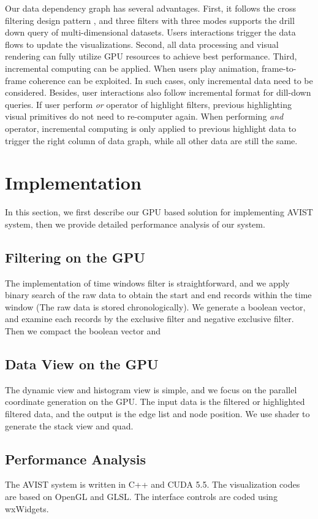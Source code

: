 \documentclass[journal]{vgtc}                %
\begin{document}
{ 
Our data dependency graph has several advantages. First, it follows the cross filtering design pattern \cite{weaver2010cross}, and three filters with three modes supports the drill down query of multi-dimensional datasets. Users interactions trigger the data flows to update the visualizations. Second, all data processing and visual rendering can fully utilize GPU resources to achieve best performance. Third,  incremental computing can be applied. When users play animation, frame-to-frame coherence can be exploited. In such cases, only incremental data need to be considered. Besides, user interactions also follow incremental format for dill-down queries. If user perform \emph{or} operator of highlight filters, previous highlighting visual primitives do not need to re-computer again. When performing \emph{and} operator, incremental computing is only applied to previous highlight data to trigger the right column of data graph, while all other data are still the same.
 

\section{Implementation}
In this section, we first describe our GPU based solution for implementing AVIST system, then we provide detailed performance analysis of our system.

\subsection{Filtering on the GPU}
The implementation of time windows filter is straightforward, and we apply binary search of the raw data to obtain the start and end records within the time window (The raw data is stored chronologically). We generate a boolean vector, and examine each records by the exclusive filter and negative exclusive filter. Then we compact the boolean vector and 
\subsection{Data View on the GPU}
The dynamic view and histogram view is simple, and we focus on the parallel coordinate generation on the GPU.
The input data is the filtered or highlighted filtered data, and the output is the edge list and node position.
We use shader to generate the stack view and quad.
\subsection{Performance Analysis}
The AVIST system is written in C++ and CUDA 5.5. The visualization codes are based on OpenGL and GLSL. The interface controls are coded using wxWidgets.

}
\end{document}
